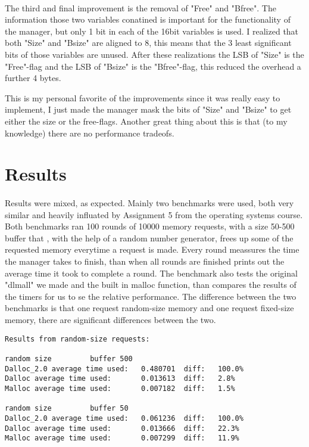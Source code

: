 \documentclass[11pt]{article}
\begin{document}
\paragraph{}
The third and final improvement is the removal of "Free" and "Bfree". The information those two variables conatined is important for the
functionality of the manager, but only 1 bit in each of the 16bit variables is used. I realized that both "Size" and "Bsize" are aligned 
to 8, this means that the 3 least significant bits of those variables are unused. After these realizations the LSB of "Size" is the 
"Free"-flag and the LSB of "Bsize" is the "Bfree"-flag, this reduced the overhead a further 4 bytes.

This is my personal favorite of the improvements since it was really easy to implement, I just made the manager mask the bits of "Size"
and "Bsize" to get either the size or the free-flags. Another great thing about this is that (to my knowledge) there are no performance
tradeofs.

\section{Results}

\paragraph{}
Results were mixed, as expected. Mainly two benchmarks were used, both very similar and heavily influated by Assignment 5 from the operating systems course.
Both benchmarks ran 100 rounds of 10000 memory requests, with a size 50-500 buffer that , with the help of a random number generator, frees up some of the 
requested memory everytime a request is made. Every round meassures the time the manager takes to finish, than when all rounds are finished prints out the 
average time it took to complete a round. The benchmark also tests the original "dlmall" we made and the built in malloc function, than compares the results
of the timers for us to se the relative performance. 
The difference between the two benchmarks is that one request random-size memory and one request fixed-size memory, there are significant differences 
between the two.

\begin{verbatim}
Results from random-size requests:

random size         buffer 500
Dalloc_2.0 average time used:   0.480701  diff:   100.0%
Dalloc average time used:       0.013613  diff:   2.8%
Malloc average time used:       0.007182  diff:   1.5%

random size         buffer 50
Dalloc_2.0 average time used:   0.061236  diff:   100.0%
Dalloc average time used:       0.013666  diff:   22.3%
Malloc average time used:       0.007299  diff:   11.9%
\end{verbatim}
\end{document}
